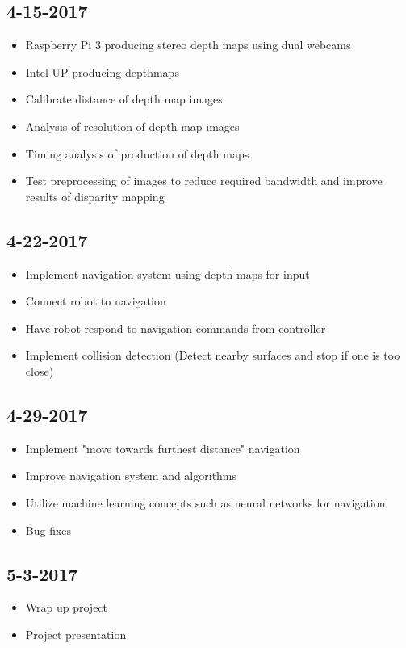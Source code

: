 \documentclass[11pt]{amsart}
\begin{document}
\subsection*{4-15-2017}
\begin{itemize}
\item Raspberry Pi 3 producing stereo depth maps using dual webcams
\item Intel UP producing depthmaps
\item Calibrate distance of depth map images
\item Analysis of resolution of depth map images
\item Timing analysis of production of depth maps
\item Test preprocessing of images to reduce required bandwidth and improve results of disparity mapping
\end{itemize}

\subsection*{4-22-2017}
\begin{itemize}
\item Implement navigation system using depth maps for input
\item Connect robot to navigation
\item Have robot respond to navigation commands from controller
\item Implement collision detection (Detect nearby surfaces and stop if one is too close)
\end{itemize}

\subsection*{4-29-2017}
\begin{itemize}
\item Implement "move towards furthest distance" navigation
\item Improve navigation system and algorithms
\item Utilize machine learning concepts such as neural networks for navigation
\item Bug fixes
\end{itemize}

\subsection*{5-3-2017}
\begin{itemize}
\item Wrap up project
\item Project presentation
\end{itemize}
\end{document}
